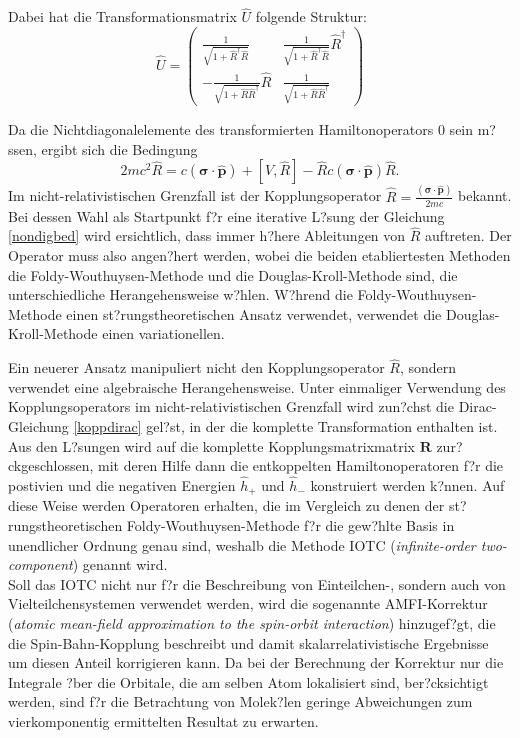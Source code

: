 Dabei hat die Transformationsmatrix $\hat{U}$ folgende Struktur:
\begin{equation}
\hat{U} = \left(\begin{array}{cc}
\frac1{\sqrt{1+\hat{R}^\dagger\hat{R}}}          & \frac1{\sqrt{1+\hat{R}^\dagger\hat{R}}} \hat{R}^\dagger\\
-\frac1{\sqrt{1+\hat{R}\hat{R}^\dagger}} \hat{R} & \frac1{\sqrt{1+\hat{R}\hat{R}^\dagger}}
\end{array}\right)
\end{equation}

Da die Nichtdiagonalelemente des transformierten Hamiltonoperators 0 sein m?ssen, ergibt sich die Bedingung
\begin{equation} \label{nondigbed}
2mc^2\hat{R} = c (\mathbf{\sigma}\cdot\hat{\mathbf{p}}) + \left[V,\hat{R}\right] - \hat{R}c(\mathbf{\sigma}\cdot\hat{\mathbf{p}})\hat{R}.
\end{equation}
Im nicht-relativistischen Grenzfall ist der Kopplungsoperator $\hat{R}=\frac{(\mathbf{\sigma}\cdot\hat{\mathbf{p}})}{2mc}$ bekannt. Bei dessen Wahl als Startpunkt f?r eine iterative L?sung der Gleichung \ref{nondigbed} wird ersichtlich, dass immer h?here Ableitungen von $\hat{R}$ auftreten. Der Operator muss also angen?hert werden, wobei die beiden etabliertesten Methoden die Foldy-Wouthuysen-Methode und die Douglas-Kroll-Methode sind, die unterschiedliche Herangehensweise w?hlen. W?hrend die Foldy-Wouthuysen-Methode einen st?rungstheoretischen Ansatz verwendet, verwendet die Douglas-Kroll-Methode einen variationellen.

Ein neuerer Ansatz manipuliert nicht den Kopplungsoperator $\hat{R}$, sondern verwendet eine algebraische Herangehensweise. Unter einmaliger Verwendung des Kopplungsoperators im nicht-relativistischen Grenzfall wird zun?chst die Dirac-Gleichung \ref{koppdirac} gel?st, in der die komplette Transformation enthalten ist. Aus den L?sungen wird auf die komplette Kopplungsmatrixmatrix $\mathbf{R}$ zur?ckgeschlossen, mit deren Hilfe dann die entkoppelten Hamiltonoperatoren f?r die postivien und die negativen Energien $\hat{h}_+$ und $\hat{h}_-$ konstruiert werden k?nnen. Auf diese Weise werden Operatoren erhalten, die im Vergleich zu denen der st?rungstheoretischen Foldy-Wouthuysen-Methode f?r die gew?hlte Basis in unendlicher Ordnung genau sind, weshalb die Methode IOTC (\emph{infinite-order two-component})\cite{Ilias07} genannt wird.\\
Soll das IOTC nicht nur f?r die Beschreibung von Einteilchen-, sondern auch von Vielteilchensystemen verwendet werden, wird die sogenannte AMFI-Korrektur (\emph{atomic mean-field approximation to the spin-orbit interaction}) hinzugef?gt, die die Spin-Bahn-Kopp\-lung beschreibt und damit skalarrelativistische Ergebnisse um diesen Anteil korrigieren kann. Da bei der Berechnung der Korrektur nur die Integrale ?ber die Orbitale, die am selben Atom lokalisiert sind, ber?cksichtigt werden, sind f?r die Betrachtung von Molek?len geringe Abweichungen zum vierkomponentig ermittelten Resultat zu erwarten.\cite{Hess96}
 



